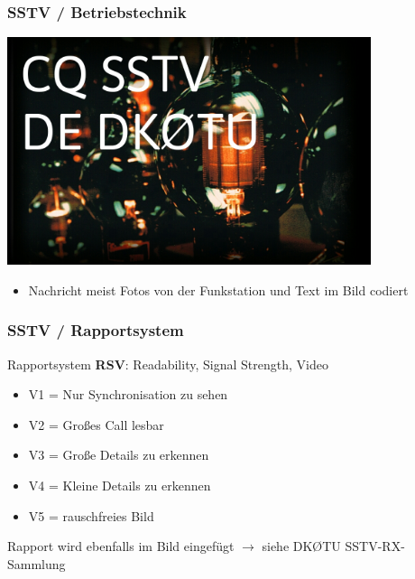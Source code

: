 \begin{frame}
    \frametitle{SSTV / Betriebstechnik}

    \begin{center}
        \includegraphics[width=0.8\textwidth]{e16/Transmittingtubes.jpg}
    \end{center}


    \begin{itemize}
        \item Nachricht meist Fotos von der Funkstation und Text im Bild codiert
    \end{itemize}

\end{frame}

\begin{frame}
    \frametitle{SSTV / Rapportsystem}
   

    Rapportsystem \textbf{RSV}\hyperlink{refs}{\cite{bv12}}: Readability, Signal Strength, Video

    \begin{itemize}
        \item V1 = Nur Synchronisation zu sehen
        \item V2 = Großes Call lesbar
        \item V3 = Große Details zu erkennen
        \item V4 = Kleine Details zu erkennen
        \item V5 = rauschfreies Bild
    \end{itemize}

    Rapport wird ebenfalls im Bild eingefügt $\rightarrow$ siehe DKØTU
    SSTV-RX-Sammlung

\end{frame}

